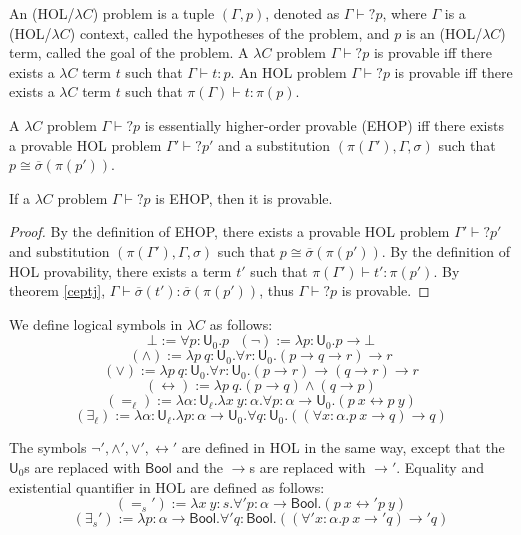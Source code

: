 \begin{definition} An (HOL/$\lambda C$) problem is a tuple $(\Gamma, p)$, denoted
  as $\Gamma \vdash? p$, where $\Gamma$ is a (HOL/$\lambda C$)
  context, called the hypotheses of the problem, and $p$ is an
  (HOL/$\lambda C$) term, called the goal of the problem. A $\lambda C$ problem
  $\Gamma \vdash? p$ is provable iff there exists a $\lambda C$ term $t$ such that
  $\Gamma \vdash t : p$. An HOL problem $\Gamma \vdash? p$ is provable iff there exists
  a $\lambda C$ term $t$ such that $\pi(\Gamma) \vdash t : \pi(p)$.
\end{definition}

\begin{definition} A $\lambda C$ problem $\Gamma \vdash? p$ is essentially higher-order provable (EHOP)
  iff there exists a provable HOL problem $\Gamma' \vdash? p'$ and a substitution
  $(\pi(\Gamma'), \Gamma, \sigma)$ such that $p \cong \overline{\sigma}(\pi(p'))$.
\end{definition}

\begin{theorem}
  If a $\lambda C$ problem $\Gamma \vdash? p$ is EHOP, then it is provable.
\end{theorem}
\begin{proof} By the definition of EHOP, there exists a provable HOL problem
  $\Gamma' \vdash? p'$ and substitution $(\pi(\Gamma'), \Gamma, \sigma)$ such that
  $p \cong \overline{\sigma}(\pi(p'))$. By the definition of HOL provability, there exists
  a term $t'$ such that $\pi(\Gamma') \vdash t' : \pi(p')$. By theorem \ref{ceptj},
  $\Gamma \vdash \overline{\sigma}(t') : \overline{\sigma}(\pi(p'))$, thus $\Gamma \vdash? p$
  is provable.
\end{proof}

\noindent We define logical symbols in $\lambda C$ as follows:
$$\bot := \forall p : \mathsf{U}_0. p \ \ \ (\neg) := \lambda p : \mathsf{U}_0. p \to \bot$$
$$(\land) := \lambda p \ q : \mathsf{U}_0. \forall r : \mathsf{U}_0. (p \to q \to r) \to r$$
$$(\lor) := \lambda p \ q : \mathsf{U}_0. \forall r : \mathsf{U}_0. (p \to r) \to (q \to r) \to r$$
$$(\leftrightarrow) := \lambda p \ q. (p \to q) \land (q \to p)$$
$$(=_\ell) := \lambda \alpha : \mathsf{U}_\ell. \lambda x \ y : \alpha. \forall p : \alpha \to \mathsf{U}_0. (p \ x \leftrightarrow p \ y)$$
$$(\exists_\ell) := \lambda \alpha : \mathsf{U}_\ell. \lambda p : \alpha \to \mathsf{U}_0. \forall q : \mathsf{U}_0. ((\forall x : \alpha. p \ x \to q) \to q)$$

\noindent The symbols $\neg', \land', \lor', \leftrightarrow'$ are defined in HOL in the
same way, except that the $\mathsf{U}_0$s are replaced with $\mathsf{Bool}$ and the $\to$s are
replaced with $\to'$. Equality and existential quantifier in HOL are defined as follows:
$$(=_s') := \lambda x \ y : s. \forall' p : \alpha \to \mathsf{Bool}. (p \ x \leftrightarrow' p \ y)$$
$$(\exists_s') := \lambda p : \alpha \to \mathsf{Bool}. \forall' q : \mathsf{Bool}. ((\forall' x : \alpha. p \ x \to' q) \to' q)$$

